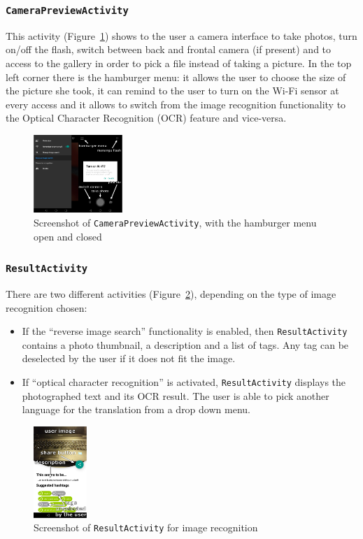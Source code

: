\subsubsection{\texttt{CameraPreviewActivity}}
This activity (Figure~\ref{fig:mainActivity}) shows to the user a camera
interface  to take photos, turn on/off the flash, switch between back and
frontal camera (if present) and to access to the gallery in order to pick a file
instead of taking a picture. In the top left corner there is the hamburger
menu: it allows the user to choose the size of the picture she took, it can remind 
to the user to turn on the Wi-Fi sensor at every access and it allows to switch 
from the image recognition functionality to the Optical Character Recognition (OCR)
feature and vice-versa.
\begin{figure}[h]
    \centering
    \includegraphics[width=0.30\textwidth]{../img/main_activity}
    \caption{Screenshot of \texttt{CameraPreviewActivity}, with the hamburger
menu open and closed}
    \label{fig:mainActivity}
\end{figure}

\subsubsection{\texttt{ResultActivity}}
There are two different activities (Figure~\ref{fig:imageResultActivity}),
depending on the type of image recognition chosen:
\begin{itemize}
        \item If the ``reverse image search'' functionality is enabled, then
\texttt{ResultActivity} contains a photo thumbnail, a description and a list of
tags. Any tag can be deselected by the user if it does not fit the image.
    \item If ``optical character recognition'' is activated,
\texttt{ResultActivity} displays the photographed text and its OCR result.
The user is able to pick another language for the translation from a drop down menu.
\end{itemize}

\begin{figure}[h]
    \centering
    \includegraphics[width=0.18\textwidth]{../img/image_result_activity}
    \caption{Screenshot of \texttt{ResultActivity} for image recognition}
    \label{fig:imageResultActivity}
\end{figure}

